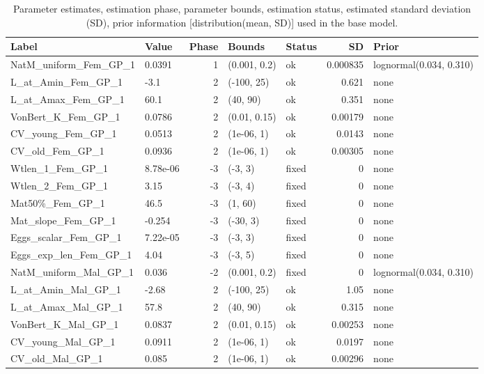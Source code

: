 \documentclass[
]{scrartcl}
\begin{document}
\begin{longtable}{llrllrl}

\caption{\label{tbl-param}Parameter estimates, estimation phase,
parameter bounds, estimation status, estimated standard deviation (SD),
prior information {[}distribution(mean, SD){]} used in the base model.}

\tabularnewline

\toprule
Label & Value & Phase & Bounds & Status & SD & Prior \\ 
\midrule\addlinespace[2.5pt]
NatM\_uniform\_Fem\_GP\_1 & 0.0391 & 1 & (0.001, 0.2) & ok & 0.000835 & lognormal(0.034, 0.310) \\ 
L\_at\_Amin\_Fem\_GP\_1 & -3.1 & 2 & (-100, 25) & ok & 0.621 & none \\ 
L\_at\_Amax\_Fem\_GP\_1 & 60.1 & 2 & (40, 90) & ok & 0.351 & none \\ 
VonBert\_K\_Fem\_GP\_1 & 0.0786 & 2 & (0.01, 0.15) & ok & 0.00179 & none \\ 
CV\_young\_Fem\_GP\_1 & 0.0513 & 2 & (1e-06, 1) & ok & 0.0143 & none \\ 
CV\_old\_Fem\_GP\_1 & 0.0936 & 2 & (1e-06, 1) & ok & 0.00305 & none \\ 
Wtlen\_1\_Fem\_GP\_1 & 8.78e-06 & -3 & (-3, 3) & fixed & 0 & none \\ 
Wtlen\_2\_Fem\_GP\_1 & 3.15 & -3 & (-3, 4) & fixed & 0 & none \\ 
Mat50\%\_Fem\_GP\_1 & 46.5 & -3 & (1, 60) & fixed & 0 & none \\ 
Mat\_slope\_Fem\_GP\_1 & -0.254 & -3 & (-30, 3) & fixed & 0 & none \\ 
Eggs\_scalar\_Fem\_GP\_1 & 7.22e-05 & -3 & (-3, 3) & fixed & 0 & none \\ 
Eggs\_exp\_len\_Fem\_GP\_1 & 4.04 & -3 & (-3, 5) & fixed & 0 & none \\ 
NatM\_uniform\_Mal\_GP\_1 & 0.036 & -2 & (0.001, 0.2) & fixed & 0 & lognormal(0.034, 0.310) \\ 
L\_at\_Amin\_Mal\_GP\_1 & -2.68 & 2 & (-100, 25) & ok & 1.05 & none \\ 
L\_at\_Amax\_Mal\_GP\_1 & 57.8 & 2 & (40, 90) & ok & 0.315 & none \\ 
VonBert\_K\_Mal\_GP\_1 & 0.0837 & 2 & (0.01, 0.15) & ok & 0.00253 & none \\ 
CV\_young\_Mal\_GP\_1 & 0.0911 & 2 & (1e-06, 1) & ok & 0.0197 & none \\ 
CV\_old\_Mal\_GP\_1 & 0.085 & 2 & (1e-06, 1) & ok & 0.00296 & none \\ 

\end{longtable}
\end{document}
